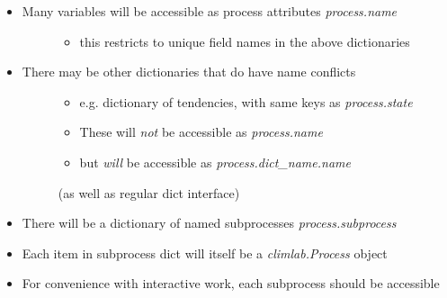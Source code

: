 \documentclass[letterpaper,10pt,english]{sphinxmanual}
\begin{document}
\begin{itemize}
\item {} \begin{description}
\item[{Many variables will be accessible as process attributes \emph{process.name}}] \leavevmode\begin{itemize}
\item {} 
this restricts to unique field names in the above dictionaries

\end{itemize}

\end{description}

\item {} \begin{description}
\item[{There may be other dictionaries that do have name conflicts}] \leavevmode\begin{itemize}
\item {} 
e.g. dictionary of tendencies, with same keys as \emph{process.state}

\item {} 
These will \emph{not} be accessible as \emph{process.name}

\item {} 
but \emph{will} be accessible as \emph{process.dict\_name.name}

\end{itemize}

(as well as regular dict interface)

\end{description}

\item {} 
There will be a dictionary of named subprocesses \emph{process.subprocess}

\item {} 
Each item in subprocess dict will itself be a \emph{climlab.Process} object

\item {} 
For convenience with interactive work, each subprocess should be accessible

\end{itemize}
\end{document}
